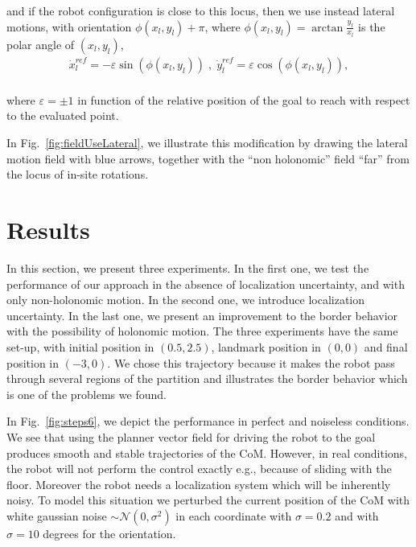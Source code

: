 and if the robot configuration is close to this locus, then we use instead lateral motions, with orientation $\phi(x_l,y_l)+\pi$, where $\phi(x_l,y_l)=\arctan\frac{y_l}{x_l}$ is the polar angle of $(x_l,y_l)$,
$$
\begin{array}{c}
\dot{x}^{ref}_l  =  -\varepsilon\sin(\phi(x_l,y_l)) \;,\; \dot{y}^{ref}_l  =  \varepsilon\cos(\phi(x_l,y_l)),  \\
\end{array}
$$

where $\varepsilon =\pm1$ in function of the relative position of the goal to reach with respect to the evaluated point. 

In Fig.~\ref{fig:fieldUseLateral}, we illustrate this modification by drawing the lateral motion field with blue arrows, together with the ``non holonomic'' field ``far'' from the locus of in-site rotations. 

\section{Results}
\label{sec:results}


In this section, we present three experiments. In the first one, we test the performance of our approach in the absence of localization uncertainty, and with only non-holonomic motion. In the second one, we introduce localization uncertainty. In the last one, we present an improvement to the border behavior with the possibility of holonomic motion. The three experiments have the same set-up, with initial position in $(0.5,2.5)$, landmark position in $(0,0)$ and final position in $(-3,0)$. We chose this trajectory because it makes the robot pass through several regions of the partition and illustrates the border behavior which is one of the problems we found.

In Fig.~\ref{fig:steps6}, we depict the performance in perfect and noiseless conditions. We see that using the planner vector field for driving the robot to the goal produces smooth and stable trajectories of the CoM. However, in real conditions, the robot will not perform the control exactly e.g., because of sliding with the floor. Moreover the robot needs a localization system which will be inherently noisy. To model this situation we perturbed the current position of the CoM with white gaussian noise $\sim \mathcal{N}(0,\sigma^2)$ in each coordinate with $\sigma = 0.2$ and with $\sigma = 10$ degrees for the orientation.

